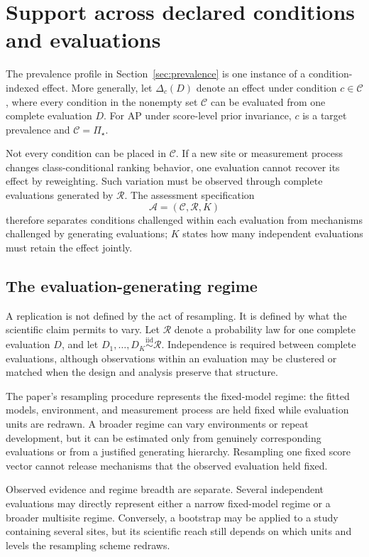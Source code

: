 \documentclass[11pt]{article}
\newcommand{\Regime}{\mathcal{R}}
\newcommand{\Assess}{\mathcal{A}}
\newcommand{\CSet}{\mathcal{C}}
\newcommand{\PSet}{\Pi_\star}
\newcommand{\iid}{\mathrel{\overset{\mathrm{iid}}{\sim}}}
\theoremstyle{remark}
\begin{document}
\section{Support across declared conditions and evaluations}
\label{sec:support}

The prevalence profile in Section~\ref{sec:prevalence} is one instance of a condition-indexed effect. More generally, let $\Delta_c(D)$ denote an effect under condition $c\in\CSet$, where every condition in the nonempty set $\CSet$ can be evaluated from one complete evaluation $D$. For AP under score-level prior invariance, $c$ is a target prevalence and $\CSet=\PSet$.

Not every condition can be placed in $\CSet$. If a new site or measurement process changes class-conditional ranking behavior, one evaluation cannot recover its effect by reweighting. Such variation must be observed through complete evaluations generated by $\Regime$. The assessment specification
\[
\Assess=(\CSet,\Regime,K)
\]
therefore separates conditions challenged within each evaluation from mechanisms challenged by generating evaluations; $K$ states how many independent evaluations must retain the effect jointly.

\subsection{The evaluation-generating regime}

A replication is not defined by the act of resampling. It is defined by what the scientific claim permits to vary. Let $\Regime$ denote a probability law for one complete evaluation $D$, and let $D_1,\ldots,D_K\iid\Regime$. Independence is required between complete evaluations, although observations within an evaluation may be clustered or matched when the design and analysis preserve that structure.

The paper's resampling procedure represents the fixed-model regime: the fitted models, environment, and measurement process are held fixed while evaluation units are redrawn. A broader regime can vary environments or repeat development, but it can be estimated only from genuinely corresponding evaluations or from a justified generating hierarchy. Resampling one fixed score vector cannot release mechanisms that the observed evaluation held fixed.

Observed evidence and regime breadth are separate. Several independent evaluations may directly represent either a narrow fixed-model regime or a broader multisite regime. Conversely, a bootstrap may be applied to a study containing several sites, but its scientific reach still depends on which units and levels the resampling scheme redraws.
\end{document}
